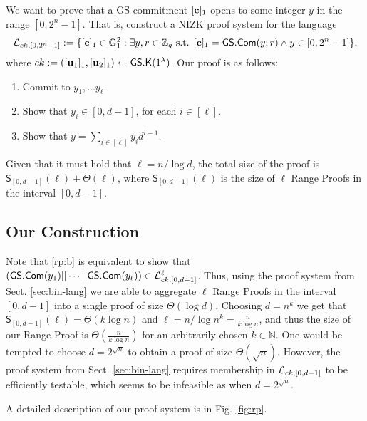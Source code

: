 We want to prove that a GS commitment $[\mathbf{c}]_1$ opens to some integer $y$ in the range $[0,2^n-1]$. That is, construct a NIZK proof system for the language
$$
\mathcal{L}_{ck,[0,2^n-1]} := \{[\mathbf{c}]_1\in\mathbb{G}_1^2: \exists y,r\in\mathbb{Z}_q\text{ s.t. }[\mathbf{c}]_1={\mathsf{GS}}.\mathsf{Com}(y;r)\wedge y\in[0,2^n-1]\},
$$
where $ck:=([\mathbf{u}_1]_1,[\mathbf{u}_2]_1)\gets{\mathsf{GS}}.\mathsf{K}(1^\lambda)$.
Our proof is as follows:
\begin{enumerate}[label=\alph*)]
\item Commit to $y_1,\ldots y_\ell$.
\item Show that $y_i\in[0,d-1]$, for each $i\in[\ell]$. \label{rp:b}
\item Show that $y=\sum_{i\in[\ell]}y_id^{i-1}$.
\end{enumerate}
Given that it must hold that $\ell=n/\log d$, the total size of the proof is $\mathsf{S}_{[0,d-1]}(\ell)+\Theta(\ell)$, where $\mathsf{S}_{[0,d-1]}(\ell)$ is the size of $\ell$ Range Proofs in the interval $[0,d-1]$.

\subsection{Our Construction}
Note that \ref{rp:b} is equivalent to show that $({\mathsf{GS}}.\mathsf{Com}(y_1)||\cdots||{\mathsf{GS}}.\mathsf{Com}(y_\ell))\in\mathcal{L}_{ck,[0,d-1]}^\ell$. Thus, using the proof system from Sect. \ref{sec:bin-lang} we are able to aggregate $\ell$ Range Proofs in the interval $[0,d-1]$ into a single proof of size $\Theta(\log d)$. Choosing $d=n^k$ we get that $\mathsf{S}_{[0,d-1]}(\ell)=\Theta(k\log n)$ and $\ell=n/\log n^k=\frac{n}{k\log n}$, and thus the size of our Range Proof is $\Theta(\frac{n}{k\log n})$ for an arbitrarily chosen $k\in\mathbb{N}$. One would be tempted to choose $d=2^{\sqrt{n}}$ to obtain a proof of size $\Theta(\sqrt{n})$. However, the proof system from Sect. \ref{sec:bin-lang} requires membership in $\mathcal{L}_{ck,[0,d-1]}$ to be efficiently testable, which seems to be infeasible as when $d=2^{\sqrt{n}}$.

A detailed description of our proof system is in Fig. \ref{fig:rp}.


